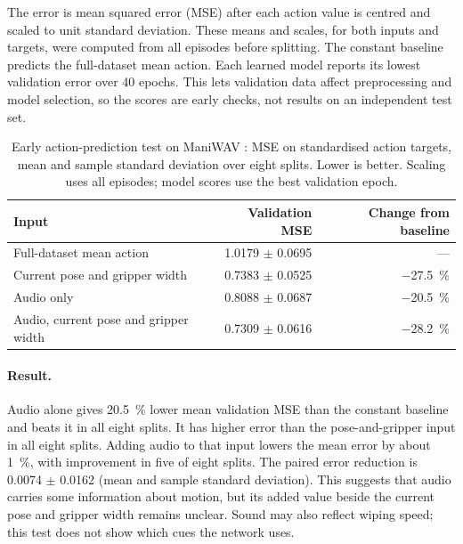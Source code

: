 \documentclass[
  english,
  accentcolor=11b,
  type=intern,
  marginpar=false,
  logofile=figures/PEARLTUDA.png
]{tudapub}
\DeclareRobustCommand{\code}[1]{\texttt{\detokenize{#1}}}
\begin{document}
The error is mean squared error (MSE) after each action value is centred and scaled to unit standard deviation. These means and scales, for both inputs and targets, were computed from all episodes before splitting. The constant baseline predicts the full-dataset mean action. Each learned model reports its lowest validation error over 40 epochs. This lets validation data affect preprocessing and model selection, so the scores are early checks, not results on an independent test set.

\begin{table}[htbp]
  \centering
  \caption{Early action-prediction test on ManiWAV \code{wipe}: MSE on standardised action targets, mean and sample standard deviation over eight splits. Lower is better. Scaling uses all episodes; model scores use the best validation epoch.}
  \label{tab:maniwav}
  \begin{tabular}{lrr}
    \toprule
    Input & Validation MSE & Change from baseline \\
    \midrule
    Full-dataset mean action & \num{1.0179} \(\pm\) \num{0.0695} & --- \\
    Current pose and gripper width & \num{0.7383} \(\pm\) \num{0.0525} & \SI{-27.5}{\percent} \\
    Audio only             & \num{0.8088} \(\pm\) \num{0.0687} & \SI{-20.5}{\percent} \\
    Audio, current pose and gripper width & \num{0.7309} \(\pm\) \num{0.0616} & \SI{-28.2}{\percent} \\
    \bottomrule
  \end{tabular}
\end{table}

\paragraph{Result.} Audio alone gives \SI{20.5}{\percent} lower mean validation MSE than the constant baseline and beats it in all eight splits. It has higher error than the pose-and-gripper input in all eight splits. Adding audio to that input lowers the mean error by about \SI{1}{\percent}, with improvement in five of eight splits. The paired error reduction is \num{0.0074} \(\pm\) \num{0.0162} (mean and sample standard deviation). This suggests that audio carries some information about motion, but its added value beside the current pose and gripper width remains unclear. Sound may also reflect wiping speed; this test does not show which cues the network uses.
\end{document}
